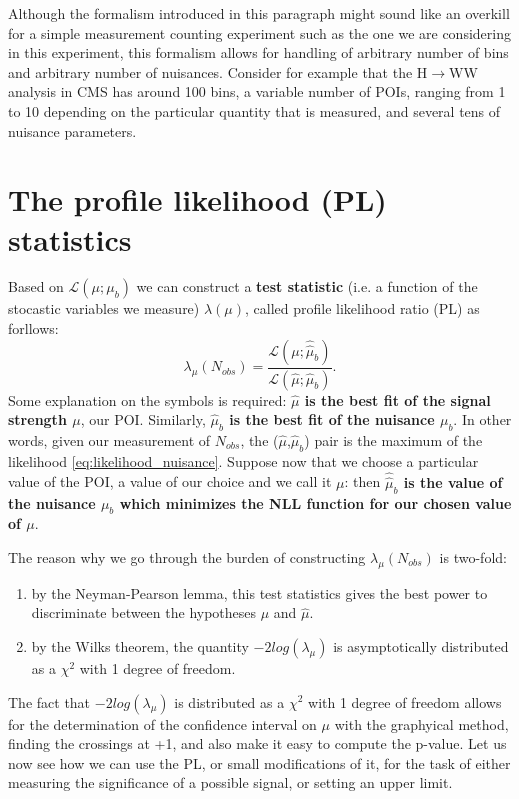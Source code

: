 \documentclass[a4paper,12pt]{article}
\begin{document}
Although the formalism introduced in this paragraph might sound like an
overkill for a simple measurement counting experiment such as the one we are
considering in this experiment, this formalism allows for handling of
arbitrary number of bins and arbitrary number of nuisances. Consider for
example that the H$\rightarrow{}$WW analysis in CMS has around 100 bins, a  variable number of
POIs, ranging from 1 to 10 depending on the particular quantity that is
measured, and
several tens of nuisance parameters.

\section{The profile likelihood (PL) statistics}
Based on $\mathcal{L}(\mu;\mu_b)$ we can construct a {\bf test statistic} (i.e. a
function of the stocastic variables we measure) $\lambda(\mu)$,
called profile likelihood ratio (PL) as
forllows:
\begin{equation}
\lambda_\mu(N_{obs})=\frac{\mathcal{L}(\mu;\hat{\hat{\mu}}_b)}{\mathcal{L}(\hat{\mu};\hat{\mu}_b)}.
\label{eq:llr}
\end{equation}
Some explanation on the symbols is required:  {\bf $\hat{\mu}$ is the best fit of
the signal strength $\mu$}, our POI. Similarly, {\bf $\hat{\mu}_b$ is the best fit
of the nuisance $\mu_b$}. In other words, given our measurement of $N_{obs}$,
the ($\hat{\mu}$,$\hat{\mu}_b$) pair is the
maximum of the
likelihood \ref{eq:likelihood_nuisance}. Suppose now that we choose a
particular value of the POI, a value of our choice and we call it $\mu$: then
{\bf $\hat{\hat{\mu}}_b$ is the value of the nuisance $\mu_b$ which minimizes the
NLL function for our chosen value of $\mu$}.

The reason why we go through the burden of constructing $\lambda_\mu(N_{obs})$
is two-fold: 
\begin{enumerate}
\item by the Neyman-Pearson lemma, this test statistics gives the
best power to discriminate between the hypotheses $\mu$ and $\hat{\mu}$. 
\item by the Wilks theorem, the quantity $-2log(\lambda_\mu)$ is asymptotically
distributed as a $\chi^2$ with 1 degree of freedom.
\end{enumerate}
The fact that $-2log(\lambda_\mu)$ is distributed as a $\chi^2$ with 1 degree
of freedom allows for the determination of the confidence interval on $\mu$
with the graphyical method, finding the crossings at +1, and also make it easy
to compute the p-value.
Let us now see how we can use the PL, or small modifications of it, for the
task of either measuring the significance of a possible signal, or setting an
upper limit.
\end{document}
